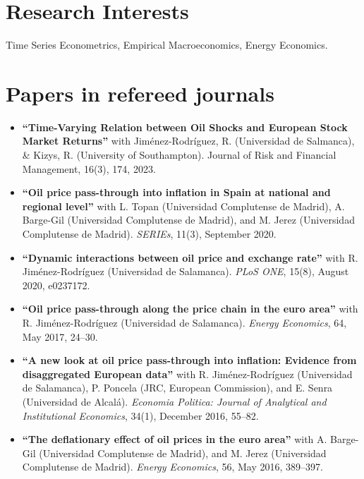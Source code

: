 \documentclass[11pt]{article}\usepackage[]{graphicx}\usepackage[usenames,dvipsnames]{xcolor}
\begin{document}
{%
\section{Research Interests}
Time Series Econometrics, Empirical Macroeconomics, Energy Economics.\\

\section{Papers in refereed journals}
\begin{itemize}

\item \textbf{``Time-Varying Relation between Oil Shocks and European Stock Market Returns''} with Jiménez-Rodríguez, R. (Universidad de Salmanca), & Kizys, R. (University of Southampton). Journal of Risk and Financial Management, 16(3), 174, 2023.

  \item \textbf{``Oil price pass-through into inflation in Spain at national and regional level''} with L. Topan (Universidad Complutense de Madrid), A. Barge-Gil (Universidad Complutense de Madrid), and M. Jerez (Universidad Complutense de Madrid). \emph{SERIEs}, 11(3), September 2020.

  \item \textbf{``Dynamic interactions between oil price and exchange rate''} with R. Jiménez-Rodríguez (Universidad de Salamanca). \emph{PLoS ONE}, 15(8), August 2020,  e0237172.

  \item \textbf{``Oil price pass-through along the price chain in the euro area''} with R. Jiménez-Rodríguez (Universidad de Salamanca). \emph{Energy Economics}, 64, May 2017, 24--30.

  \item \textbf{``A new look at oil price pass-through into inflation: Evidence from disaggregated European data''} with R. Jiménez-Rodríguez (Universidad de Salamanca), P. Poncela (JRC, European Commission), and E. Senra (Universidad de Alcalá). \emph{Economia Politica: Journal of Analytical and Institutional Economics}, 34(1), December 2016, 55--82.

  \item \textbf{``The deflationary effect of oil prices in the euro area''} with A. Barge-Gil (Universidad Complutense de Madrid), and M. Jerez (Universidad Complutense de Madrid). \emph{Energy Economics}, 56, May 2016, 389--397.
\end{itemize}

}
\end{document}
